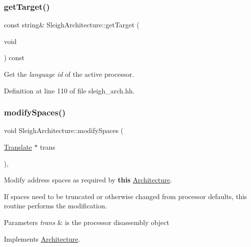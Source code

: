 \subsubsection{\texorpdfstring{getTarget()}{getTarget()}}
{\footnotesize\ttfamily const string\& Sleigh\+Architecture\+::get\+Target (\begin{DoxyParamCaption}\item[{void}]{ }\end{DoxyParamCaption}) const\hspace{0.3cm}{\ttfamily [inline]}}



Get the {\itshape language} {\itshape id} of the active processor. 



Definition at line 110 of file sleigh\+\_\+arch.\+hh.

\mbox{\label{class_sleigh_architecture_aaf0c0ad5b1160d42fecce0a27ce05674}} 
\subsubsection{\texorpdfstring{modifySpaces()}{modifySpaces()}}
{\footnotesize\ttfamily void Sleigh\+Architecture\+::modify\+Spaces (\begin{DoxyParamCaption}\item[{\mbox{\hyperlink{class_translate}{Translate}} $\ast$}]{trans }\end{DoxyParamCaption})\hspace{0.3cm}{\ttfamily [protected]}, {\ttfamily [virtual]}}



Modify address spaces as required by {\bfseries{this}} \mbox{\hyperlink{class_architecture}{Architecture}}. 

If spaces need to be truncated or otherwise changed from processor defaults, this routine performs the modification. 
\begin{DoxyParams}{Parameters}
{\em trans} & is the processor disassembly object \\
\hline
\end{DoxyParams}


Implements \mbox{\hyperlink{class_architecture_aec1784d8729ba0f13cd7ea63ee546995}{Architecture}}.



